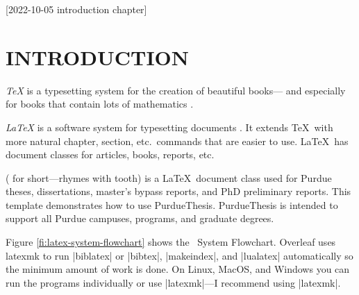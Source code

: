[2022-10-05 introduction chapter]

\chapter{INTRODUCTION}


{\sl\TeX\/} is a typesetting system for the creation of beautiful books---%
and especially for books that contain lots of mathematics
\cite[page v]{knuth2012}.

{\sl\LaTeX\/} is a software system for typesetting documents
\cite[back cover]{lamport1994}.
It extends \TeX\ with more natural chapter,
section,
etc.~commands that are easier to use.
\LaTeX\ has document classes for
articles,
books,
reports,
etc.

{\sl\PurdueThesisLogo\/}
({\sl\PuThLogo} for short---rhymes with tooth)
is a \LaTeX\ document class used for Purdue theses,
dissertations,
master’s bypass reports,
and PhD preliminary reports.
This template demonstrates how to use PurdueThesis.
PurdueThesis is intended to support all Purdue campuses,
programs,
and graduate degrees.

Figure \ref{fi:latex-system-flowchart} shows the \LaTeXLogo\ System Flowchart.
Overleaf
\cite{overleaf}
uses latexmk
\cite{latexmk}
to run
|biblatex| or |bibtex|,
|makeindex|,
and |lualatex| automatically
so the minimum amount of work is done.
On Linux,
MacOS,
and Windows you can run the programs individually
or use |latexmk|---I recommend using |latexmk|.
  
